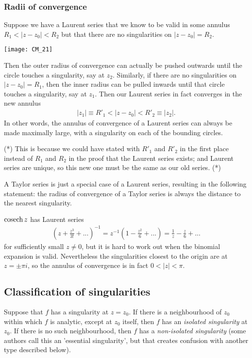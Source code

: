 \documentclass[a4paper]{article}
\begin{document}
\subsubsection{Radii of convergence}
Suppose we have a Laurent series that we know to be valid in some annulus $R_1 < |z-z_0| < R_2$ but that there are no singularities on $|z-z_0|=R_2$.

\texttt{[image: CM\_21]}

Then the outer radius of convergence can actually be pushed outwards until the circle touches a singularity, say at $z_2$. Similarly, if there are no singularities on $|z-z_0|=R_1$, then the inner radius can be pulled inwards until that circle touches a singularity, say at $z_1$. Then our Laurent series in fact converges in the new annulus
\begin{equation*}
\begin{aligned}
|z_1| \equiv R'_1 < |z-z_0| < R'_2 \equiv |z_2|.
\end{aligned}
\end{equation*}
In other words, the annulus of convergence of a Laurent series can always be made maximally large, with a singularity on each of the bounding circles.

(*) This is because we could have stated with $R'_1$ and $R'_2$ in the first place instead of $R_1$ and $R_2$ in the proof that the Laurent series exists; and Laurent series are unique, so this new one must be the same as our old series. (*)

A Taylor series is just a special case of a Laurent series, resulting in the following statement: the radius of convergence of a Taylor series is always the distance to the nearest singularity.

\begin{eg}
$\operatorname{cosech} z$ has Laurent series
\begin{equation*}
\begin{aligned}
\left(z+\frac{z^3}{3!}+...\right)^{-1} = z^{-1} \left(1-\frac{z^2}{6} + ... \right) = \frac{1}{z} - \frac{z}{6} + ...
\end{aligned}
\end{equation*}
for sufficiently small $z \neq 0$, but it is hard to work out when the binomial expansion is valid. Nevertheless the singularities closest to the origin are at $z=\pm \pi i$, so the annulus of convergence is in fact $0<|z|<\pi$.
\end{eg}

\subsection{Classification of singularities}
Suppose that $f$ has a singularity at $z=z_0$. If there is a neighbourhood of $z_0$ within which $f$ is analytic, except at $z_0$ itself, then $f$ has an \emph{isolated singularity} at $z_0$. If there is no such neighbourhood, then $f$ has a \emph{non-isolated singularity} (some authors call this an 'essential singularity', but that creates confusion with another type described below).
\end{document}
